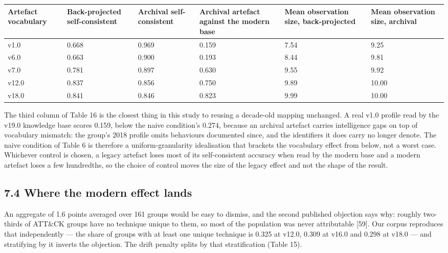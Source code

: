 \documentclass[11pt,a4paper]{article}
\begin{document}
\begin{center}\footnotesize
\begin{tabular}{llllll}
\toprule
Artefact vocabulary & Back-projected self-consistent & Archival self-consistent & Archival artefact against the modern base & Mean observation size, back-projected & Mean observation size, archival \\
\midrule
v1.0 & 0.668 & 0.969 & 0.159 & 7.54 & 9.25 \\
v6.0 & 0.663 & 0.900 & 0.193 & 8.44 & 9.81 \\
v7.0 & 0.781 & 0.897 & 0.630 & 9.55 & 9.92 \\
v12.0 & 0.837 & 0.856 & 0.750 & 9.89 & 10.00 \\
v18.0 & 0.841 & 0.846 & 0.823 & 9.99 & 10.00 \\
\bottomrule
\end{tabular}
\end{center}

The third column of Table 16 is the closest thing in this study to reusing a decade-old mapping unchanged. A real v1.0 profile read by the v19.0 knowledge base scores 0.159, below the naive condition's 0.274, because an archival artefact carries intelligence gaps on top of vocabulary mismatch: the group's 2018 profile omits behaviours documented since, and the identifiers it does carry no longer denote. The naive condition of Table 6 is therefore a uniform-granularity idealisation that brackets the vocabulary effect from below, not a worst case. Whichever control is chosen, a legacy artefact loses most of its self-consistent accuracy when read by the modern base and a modern artefact loses a few hundredths, so the choice of control moves the size of the legacy effect and not the shape of the result.

\subsection{7.4 Where the modern effect lands}

An aggregate of 1.6 points averaged over 161 groups would be easy to dismiss, and the second published objection says why: roughly two-thirds of ATT\&CK groups have no technique unique to them, so most of the population was never attributable [59]. Our corpus reproduces that independently — the share of groups with at least one unique technique is 0.325 at v12.0, 0.309 at v16.0 and 0.298 at v18.0 — and stratifying by it inverts the objection. The drift penalty splits by that stratification (Table 15).
\end{document}
